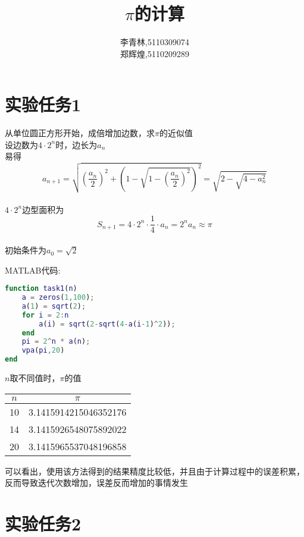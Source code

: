 \documentclass[12pt]{article}
\begin{document}
\begin{CJK*}{UTF8}{gbsn}

\date{}
\title{$\pi$的计算}
\author{李青林,5110309074\\郑辉煌,5110209289}
\maketitle

\section{实验任务1}
	
	从单位圆正方形开始，成倍增加边数，求$\pi$的近似值\\
	
	设边数为$4\cdot{}2^n$时，边长为$a_n$\\
	易得\\
	$$a_{n+1}=\sqrt{\left(\dfrac{a_n}{2}\right)^2+\left(1-\sqrt{1-\left(\dfrac{a_n}{2}\right)^2}\right)^2}=\sqrt{2-\sqrt{4-a_n^2}}$$\\
	$4\cdot{}2^n$边型面积为\\
	$$S_{n+1}=4\cdot{}2^n\cdot{\dfrac{1}{4}\cdot{a_n}}=2^na_n\approx\pi$$\\
	初始条件为$a_0=\sqrt{2}$
	
	MATLAB代码:
	\begin{lstlisting}[language = matlab]
function task1(n)
    a = zeros(1,100);
    a(1) = sqrt(2);
    for i = 2:n
        a(i) = sqrt(2-sqrt(4-a(i-1)^2));
    end
    pi = 2^n * a(n);
    vpa(pi,20)
end
	\end{lstlisting}
	$n$取不同值时，$\pi$的值\\
	\begin{tabular}{|c|c|}
	\hline
	$n$ & $\pi$\\
	\hline 
	10 & 3.1415914215046352176 \\ 
	\hline 
	14 & 3.1415926548075892022 \\ 
	\hline 
	20 & 3.1415965537048196858
	 \\ 
	\hline 
	\end{tabular} 
	
	可以看出，使用该方法得到的结果精度比较低，并且由于计算过程中的误差积累，反而导致迭代次数增加，误差反而增加的事情发生
	
\section{实验任务2}

\end{CJK*}
\end{document}
